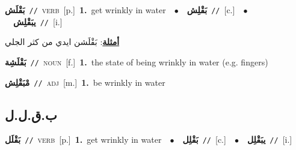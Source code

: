 \documentclass[10pt,a4paper,twoside]{article} %
\begin{document}
\begin{multicols}{2}
{\setlength\topsep{0pt}\textbf{\foreignlanguage{arabic}{بَقْلَش}}\ {\color{gray}\texttt{//}\color{black}}\ \textsc{verb}\ [p.]\ \textbf{1.}~get wrinkly in water\ \ $\bullet$\ \ \setlength\topsep{0pt}\textbf{\foreignlanguage{arabic}{بَقْلِش}}\ {\color{gray}\texttt{//}\color{black}}\ [c.]\ \ $\bullet$\ \ \setlength\topsep{0pt}\textbf{\foreignlanguage{arabic}{يبَقْلِش}}\ {\color{gray}\texttt{//}\color{black}}\ [i.]\  \begin{flushright}\color{gray}\foreignlanguage{arabic}{\textbf{\underline{\foreignlanguage{arabic}{أمثلة}}}: بَقْلَشن ايدي من كثر الجلي}\end{flushright}\color{black}} \vspace{2mm}

{\setlength\topsep{0pt}\textbf{\foreignlanguage{arabic}{بَقْلَشِة}}\ {\color{gray}\texttt{//}\color{black}}\ \textsc{noun}\ [f.]\ \textbf{1.}~the state of being wrinkly in water (e.g. fingers)\ } \vspace{2mm}

{\setlength\topsep{0pt}\textbf{\foreignlanguage{arabic}{مْبَقْلِش}}\ {\color{gray}\texttt{//}\color{black}}\ \textsc{adj}\ [m.]\ \textbf{1.}~be wrinkly in water\ } \vspace{2mm}

\vspace{-3mm}
\subsection*{\color{blue}\foreignlanguage{arabic}{ب.ق.ل.ل}\color{blue}{}} 

{\setlength\topsep{0pt}\textbf{\foreignlanguage{arabic}{بَقْلَل}}\ {\color{gray}\texttt{//}\color{black}}\ \textsc{verb}\ [p.]\ \textbf{1.}~get wrinkly in water\ \ $\bullet$\ \ \setlength\topsep{0pt}\textbf{\foreignlanguage{arabic}{بَقْلِل}}\ {\color{gray}\texttt{//}\color{black}}\ [c.]\ \ $\bullet$\ \ \setlength\topsep{0pt}\textbf{\foreignlanguage{arabic}{يبَقْلِل}}\ {\color{gray}\texttt{//}\color{black}}\ [i.]\ } \vspace{2mm}


\end{multicols}
\end{document}
